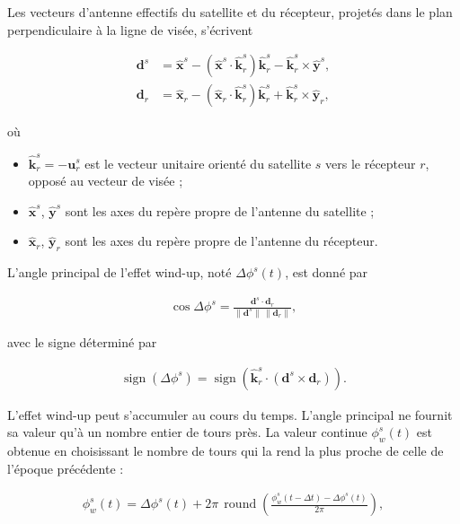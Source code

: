 Les vecteurs d'antenne effectifs du satellite et du récepteur, projetés dans le plan perpendiculaire à la ligne de visée, s'écrivent

\begin{align}
\mathbf d^s
&=
\hat{\mathbf x}^s
-(\hat{\mathbf x}^s\cdot\hat{\mathbf k}_r^s)\hat{\mathbf k}_r^s
-\hat{\mathbf k}_r^s\times\hat{\mathbf y}^s,
\\
\mathbf d_r
&=
\hat{\mathbf x}_r
-(\hat{\mathbf x}_r\cdot\hat{\mathbf k}_r^s)\hat{\mathbf k}_r^s
+\hat{\mathbf k}_r^s\times\hat{\mathbf y}_r,
\end{align}

où

\begin{itemize}
    \item $\hat{\mathbf k}_r^s=-\mathbf u_r^s$ est le vecteur unitaire
    orienté du satellite $s$ vers le récepteur $r$, opposé au vecteur de visée ;
    \item $\hat{\mathbf x}^s$, $\hat{\mathbf y}^s$ sont les axes du repère propre de l'antenne du satellite ;
    \item $\hat{\mathbf x}_r$, $\hat{\mathbf y}_r$ sont les axes du repère propre de l'antenne du récepteur.
\end{itemize}

L'angle principal de l'effet wind-up, noté $\Delta\phi^s(t)$, est donné par

\begin{align}
\cos\Delta\phi^s
=
\frac{\mathbf d^s\cdot\mathbf d_r}
{\|\mathbf d^s\|\,\|\mathbf d_r\|},
\end{align}

avec le signe déterminé par

\begin{align}
\operatorname{sign}(\Delta\phi^s)
=
\operatorname{sign}\!\left(
\hat{\mathbf k}_r^s\cdot(\mathbf d^s\times\mathbf d_r)
\right).
\end{align}

L'effet wind-up peut s'accumuler au cours du temps. L'angle principal ne
fournit sa valeur qu'à un nombre entier de tours près. La valeur continue
$\phi_w^s(t)$ est obtenue en choisissant le nombre de tours qui la rend la
plus proche de celle de l'époque précédente :

\begin{align}
\phi_w^s(t)
=
\Delta\phi^s(t)
+2\pi\,\operatorname{round}\!\left(
\frac{\phi_w^s(t-\Delta t)-\Delta\phi^s(t)}{2\pi}
\right),
\end{align}

